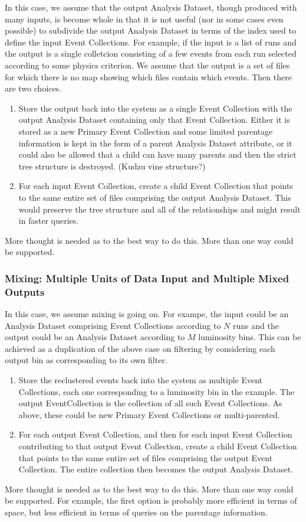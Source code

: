 \documentclass{cmspaper}
\begin{document}
In this case, we assume that the output Analysis Dataset, though produced with
many inputs, is become whole in that it is not useful (nor in some cases 
even possible) to subdivide the output Analysis Dataset in terms of the 
index used to define the input Event Collections.  For example, if the input is 
a list of runs and the  output is a single colletcion consisting of a few 
events from each run selected according  to some physics criterion. We 
assume that the output is a set of files for which there is no map
showing which files contain which events.  Then there are two choices.
\begin{enumerate}
\item Store the output back into the system as a single Event Collection with 
the output Analysis Dataset containing only that Event Collection.  Either it 
is stored as a new Primary Event Collection and some limited parentage information 
is kept in the form of a parent Analysis Dataset attribute,  or it 
could also be allowed that a child can have many parents and then the strict 
tree structure is destroyed.  (Kudzu vine structure?) 
\item For each input Event Collection, create a child Event Collection that points 
to the same entire set of files comprising the output Analysis Dataset.  This
would preserve the tree structure and all of the relationships and might 
result in faster queries.  
\end{enumerate}
More thought is needed as to the best way to do this.  More than one way could be 
supported.  

\subsubsection{Mixing: Multiple Units of Data Input and Multiple Mixed Outputs}

In this case, we assume mixing is going on.  For exampe, the input could be 
an Analysis Dataset comprising Event Collections according to $N$ runs and the 
output could be an Analysis Dataset according to $M$ luminosity bins.  This 
can be achieved as a duplication of the above case on filtering by 
considering each output bin as corresponding to its own filter.  
\begin{enumerate}
\item Store the reclustered events back into the system as multiple 
Event Collections, each one corresponding to a luminosity bin in the example. 
The output EventCollection is the collection of all such Event Collections.
As above, these could be new Primary Event Collections or multi-parented.
\item For each output Event Collection, and then for each input Event Collection
contributing to that output Event Collection, create a child Event Collection 
that points to the same entire set of files comprising the output Event Collection.
The entire collection then becomes the output Analysis Dataset.  
\end{enumerate}
More thought is needed as to the best way to do this.  More than one way could be 
supported.  For example, the first option is probably more efficient in terms of 
space, but less efficient in terms of queries on the parentage information.
\end{document}
